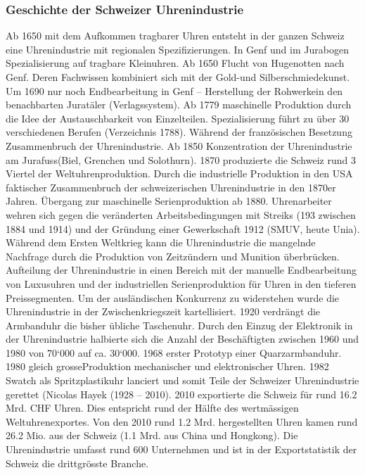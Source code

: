 \documentclass[10pt, openright=true]{scrartcl}
\begin{document}
\subsubsection{Geschichte der Schweizer Uhrenindustrie}
Ab 1650 mit dem Aufkommen tragbarer Uhren entsteht in der ganzen Schweiz eine Uhrenindustrie mit regionalen Spezifizierungen. In Genf und im Jurabogen Spezialisierung auf tragbare Kleinuhren. Ab 1650 Flucht von Hugenotten nach Genf. Deren Fachwissen kombiniert sich mit der Gold-und Silberschmiedekunst. Um 1690 nur noch Endbearbeitung in Genf – Herstellung der Rohwerkein den benachbarten Juratäler (Verlagssystem). Ab 1779 maschinelle Produktion durch die Idee der Austauschbarkeit von Einzelteilen. Spezialisierung führt zu über 30 verschiedenen Berufen (Verzeichnis 1788). Während der französischen Besetzung Zusammenbruch der Uhrenindustrie. Ab 1850 Konzentration der Uhrenindustrie am Jurafuss(Biel, Grenchen und Solothurn). 1870 produzierte die Schweiz rund 3 Viertel der Weltuhrenproduktion. Durch die industrielle Produktion in den USA faktischer Zusammenbruch der schweizerischen Uhrenindustrie in den 1870er Jahren. Übergang zur maschinelle Serienproduktion ab 1880. Uhrenarbeiter wehren sich gegen die veränderten Arbeitsbedingungen mit Streiks (193 zwischen 1884 und 1914) und der Gründung einer Gewerkschaft 1912 (SMUV, heute Unia). Während dem Ersten Weltkrieg kann die Uhrenindustrie die mangelnde Nachfrage durch die Produktion von Zeitzündern und Munition überbrücken. Aufteilung der Uhrenindustrie in einen Bereich mit der manuelle Endbearbeitung von Luxusuhren und der industriellen Serienproduktion für Uhren in den tieferen Preissegmenten. Um der ausländischen Konkurrenz zu widerstehen wurde die Uhrenindustrie in der Zwischenkriegszeit kartellisiert. 1920 verdrängt die Armbanduhr die bisher übliche Taschenuhr. Durch den Einzug der Elektronik in der Uhrenindustrie halbierte sich die Anzahl der Beschäftigten zwischen 1960 und 1980 von 70‘000 auf ca. 30‘000. 1968 erster Prototyp einer Quarzarmbanduhr. 1980 gleich grosseProduktion mechanischer und elektronischer Uhren. 1982 Swatch als Spritzplastikuhr lanciert und somit Teile der Schweizer Uhrenindustrie gerettet (Nicolas Hayek (1928 – 2010). 2010 exportierte die Schweiz für rund 16.2 Mrd. CHF Uhren. Dies entspricht rund der Hälfte des
wertmässigen Weltuhrenexportes. Von den 2010 rund 1.2 Mrd. hergestellten Uhren kamen rund 26.2 Mio. aus der Schweiz (1.1 Mrd. aus China und Hongkong). Die Uhrenindustrie umfasst rund 600 Unternehmen und ist in der Exportstatistik der Schweiz die drittgrösste Branche.
\end{document}
